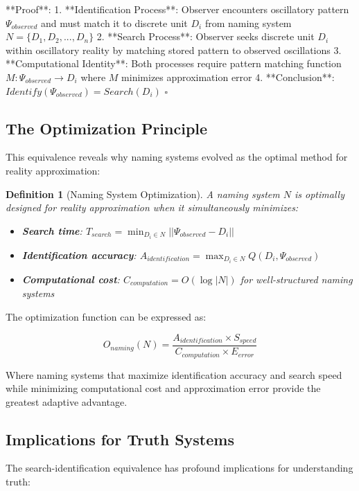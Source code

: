 \documentclass[12pt]{article}
\newtheorem{definition}{Definition}
\begin{document}
**Proof**:
1. **Identification Process**: Observer encounters oscillatory pattern $\Psi_{observed}$ and must match it to discrete unit $D_i$ from naming system $N = \{D_1, D_2, ..., D_n\}$
2. **Search Process**: Observer seeks discrete unit $D_i$ within oscillatory reality by matching stored pattern to observed oscillations
3. **Computational Identity**: Both processes require pattern matching function $M: \Psi_{observed} \rightarrow D_i$ where $M$ minimizes approximation error
4. **Conclusion**: $Identify(\Psi_{observed}) = Search(D_i)$ $\square$

\subsection{The Optimization Principle}

This equivalence reveals why naming systems evolved as the optimal method for reality approximation:

\begin{definition}[Naming System Optimization]
A naming system $N$ is optimally designed for reality approximation when it simultaneously minimizes:
\begin{itemize}
\item \textbf{Search time}: $T_{search} = \min_{D_i \in N} ||\Psi_{observed} - D_i||$
\item \textbf{Identification accuracy}: $A_{identification} = \max_{D_i \in N} Q(D_i, \Psi_{observed})$
\item \textbf{Computational cost}: $C_{computation} = O(\log|N|)$ for well-structured naming systems
\end{itemize}
\end{definition}

The optimization function can be expressed as:

$$O_{naming}(N) = \frac{A_{identification} \times S_{speed}}{C_{computation} \times E_{error}}$$

Where naming systems that maximize identification accuracy and search speed while minimizing computational cost and approximation error provide the greatest adaptive advantage.

\subsection{Implications for Truth Systems}

The search-identification equivalence has profound implications for understanding truth:
\end{document}
